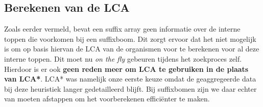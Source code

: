 \subsection{Berekenen van de LCA}\label{subsec:berekenen-van-de-lca}
Zoals eerder vermeld, bevat een suffix array geen informatie over de interne toppen die voorkomen bij een suffixboom.
Dit zorgt ervoor dat het niet mogelijk is om op basis hiervan de LCA van de organismen voor te berekenen voor al deze interne toppen.
Dit moet nu \textit{on the fly} gebeuren tijdens het zoekproces zelf.
Hierdoor is er ook \textbf{geen reden meer om LCA te gebruiken in de plaats van LCA*}.
LCA* was namelijk onze eerste keuze omdat de geaggregeerde data bij deze heuristiek langer gedetailleerd blijft.
Bij suffixbomen zijn we daar echter van moeten afstappen om het voorberekenen efficiënter te maken.

